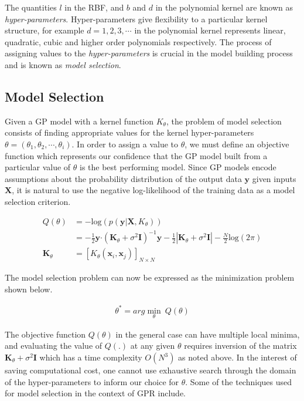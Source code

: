 The quantities $l$ in the RBF, and $b$ and $d$ in the polynomial kernel are known as \emph{hyper-parameters}. Hyper-parameters give flexibility to a particular kernel structure, for example $d = 1, 2, 3, \cdots$ in the polynomial kernel represents linear, quadratic, cubic and higher order polynomials respectively. The process of assigning values to the \emph{hyper-parameters} is crucial in the model building process and is known as \emph{model selection}. 

\subsection{Model Selection}

Given a GP model with a kernel function $K_\theta$, the problem of model selection consists of finding appropriate values for the kernel hyper-parameters $\theta = \left(\theta_1, \theta_2, \cdots, \theta_i\right)$. In order to assign a value to $\theta$, we must define an objective function which represents our confidence that the GP model built from a particular value of $\theta$ is the best performing model. Since GP models encode assumptions about the probability distribution of the output data $\mathbf{y}$ given inputs $\mathbf{X}$, it is natural to use the negative log-likelihood of the training data as a model selection criterion. 

\begin{align*}
  Q(\theta) & = - \text{log}(p(\mathbf{y}|\mathbf{X}, K_\theta)) \\
            & = -\frac{1}{2} \mathbf{y}\boldsymbol{\cdot} (\mathbf{K}_\theta + \sigma^{2} \mathbf{I})^{-1} \mathbf{y} - \frac{1}{2}|\mathbf{K}_\theta + \sigma^{2} \mathbf{I}| - \frac{N}{2}\text{log}(2\pi) \\
  \mathbf{K}_\theta & = [K_{\theta}(\mathbf{x}_i, \mathbf{x}_j)]_{N \times N}
\end{align*}

The model selection problem can now be expressed as the minimization problem shown below.

\begin{align*}
\theta^* = arg\min_{\theta} \ Q(\theta)
\end{align*}

The objective function $Q(\theta)$ in the general case can have multiple local minima, and evaluating the value of $Q(.)$ at any given $\theta$ requires inversion of the matrix $\mathbf{K}_\theta + \sigma^{2} \mathbf{I}$ which has a time complexity $O(N^3)$ as noted above. In the interest of saving computational cost, one cannot use exhaustive search through the domain of the hyper-parameters to inform our choice for $\theta$. Some of the techniques used for model selection in the context of GPR include.

